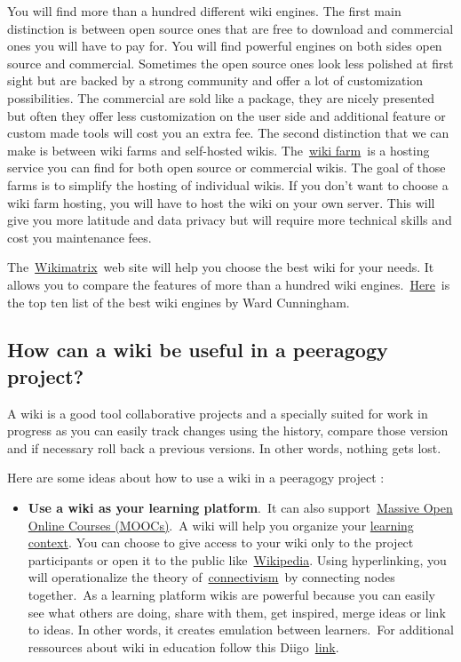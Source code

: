 You will find more than a hundred different wiki engines. The first main
distinction is between open source ones that are free to download and
commercial ones you will have to pay for. You will find powerful engines
on both sides open source and commercial. Sometimes the open source ones
look less polished at first sight but are backed by a strong community
and offer a lot of customization possibilities. The commercial are sold
like a package, they are nicely presented but often they offer less
customization on the user side and additional feature or custom made
tools will cost you an extra fee. The second distinction that we can
make is between wiki farms and self-hosted wikis.
The~\href{http://en.wikipedia.org/wiki/Wiki\_hosting\_service}{wiki
farm}~is a hosting service you can find for both open source or
commercial wikis. The goal of those farms is to simplify the hosting of
individual wikis. If you don't want to choose a wiki farm hosting, you
will have to host the wiki on your own server. This will give you more
latitude and data privacy but will require more technical skills and
cost you maintenance fees.

The~\href{http://www.wikimatrix.org/}{Wikimatrix}~web site will help you
choose the best wiki for your needs. It allows you to compare the
features of more than a hundred wiki
engines.~\href{http://c2.com/cgi/wiki?TopTenWikiEngines}{Here}~is the
top ten list of the best wiki engines by Ward Cunningham.

\subsection{How can a wiki be useful in a peeragogy project?}

A wiki is a good tool collaborative projects and a specially suited for
work in progress as you can easily track changes using the history,
compare those version and if necessary roll back a previous versions. In
other words, nothing gets lost.

Here are some ideas about how to use a wiki in a peeragogy project :

\begin{itemize}
\item
  \textbf{Use a wiki as your learning platform}.~It can also
  support~\href{http://socialmediaclassroom.com/host/peeragogy/wiki/connectivism-practice-how-organize-a-mooc}{Massive
  Open Online Courses (MOOCs)}.~A wiki will help you organize your
  \href{http://socialmediaclassroom.com/host/peeragogy/wiki/organizing-a-learning-context}{learning
  context}. You can choose to give access to your wiki only to the
  project participants or open it to the public
  like~\href{http://www.wikipedia.org/}{Wikipedia}. Using hyperlinking,
  you will operationalize the theory
  of~\href{http://en.wikipedia.org/wiki/Connectivism}{connectivism}~by
  connecting nodes together.~As a learning platform wikis are powerful
  because you can easily see what others are doing, share with them, get
  inspired, merge ideas or link to ideas. In other words, it creates
  emulation between learners.~For additional ressources about wiki in
  education follow this
  Diigo~\href{http://www.diigo.com/user/regisb/wiki\%20education}{link}.
\end{itemize}

